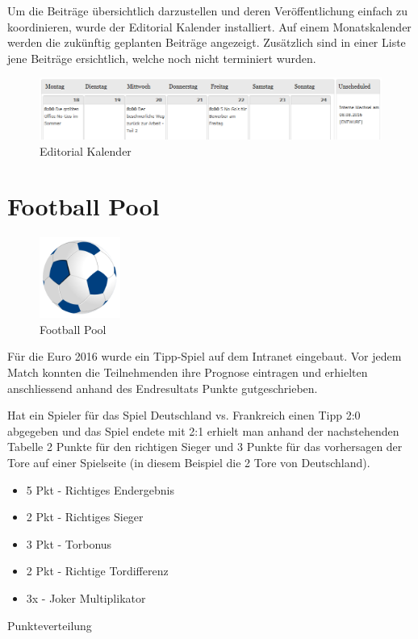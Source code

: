 \documentclass[a4paper,11pt,twoside,titlepage,openright]{report}
\numberwithin{equation}{section}		%
\numberwithin{figure}{section}			%
\numberwithin{table}{section}				%
\begin{document}
Um die Beiträge übersichtlich darzustellen und deren Veröffentlichung einfach zu koordinieren, wurde der Editorial Kalender installiert. Auf einem Monatskalender werden die zukünftig geplanten Beiträge angezeigt. Zusätzlich sind in einer Liste jene Beiträge ersichtlich, welche noch nicht terminiert wurden.

\begin{figure}[H]
\centering
\vspace{+20px}
\includegraphics[width=\textwidth]{Images/Calendar.png}
\caption{Editorial Kalender}
\end{figure}
\newpage

\section{Football Pool}

\begin{figure}
\vspace{-20px}
\centering
\includegraphics[width=100px]{Images/Football_Pool.png}
\caption{Football Pool}
\vspace{-10px}
\end{figure}


Für die Euro 2016 wurde ein Tipp-Spiel auf dem Intranet eingebaut. Vor jedem Match konnten die Teilnehmenden ihre Prognose eintragen und erhielten anschliessend anhand des Endresultats Punkte gutgeschrieben.

Hat ein Spieler für das Spiel Deutschland vs. Frankreich einen Tipp 2:0 abgegeben und das Spiel endete mit 2:1 erhielt man anhand der nachstehenden Tabelle 2 Punkte für den richtigen Sieger und 3 Punkte für das vorhersagen der Tore auf einer Spielseite (in diesem Beispiel die 2 Tore von Deutschland).

\begin{table}[H]
\centering
\begin{itemize}
\item 5 Pkt - Richtiges Endergebnis
\item 2 Pkt - Richtiges Sieger
\item 3 Pkt - Torbonus
\item 2 Pkt - Richtige Tordifferenz
\item 3x - Joker Multiplikator 
\end{itemize}
\caption{Punkteverteilung}
\end{table}
\end{document}

